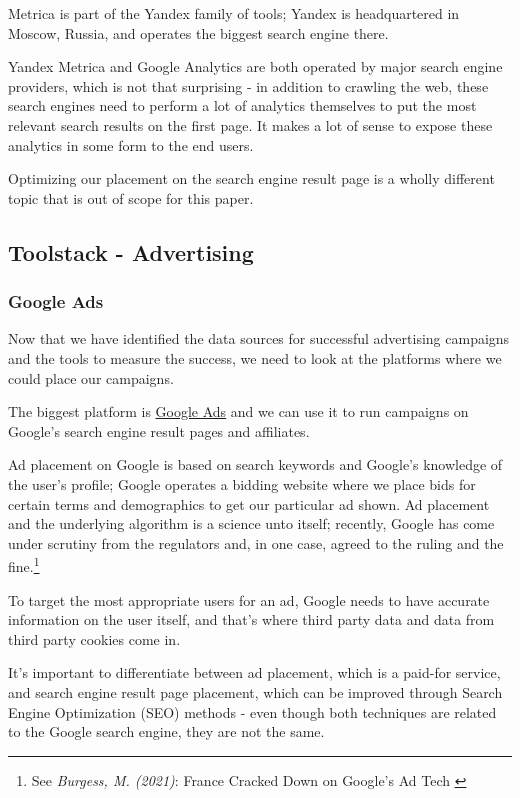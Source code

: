 Metrica is part of the Yandex family of tools; Yandex is headquartered in Moscow, Russia, and operates the biggest search engine there.

Yandex Metrica and Google Analytics are both operated by major search engine providers, which is not that surprising - in addition to crawling the web, these search engines need to perform a lot of analytics themselves to put the most relevant search results on the first page. It makes a lot of sense to expose these analytics in some form to the end users.

Optimizing our placement on the search engine result page is a wholly different topic that is out of scope for this paper.

\subsection{Toolstack - Advertising}

\subsubsection{Google Ads}

Now that we have identified the data sources for successful advertising campaigns and the tools to measure the success, we need to look at the platforms where we could place our campaigns. 

The biggest platform is \href{https://ads.google.com/home/}{Google Ads} and we can use it to run campaigns on Google's search engine result pages and affiliates.

Ad placement on Google is based on search keywords and Google's knowledge of the user's profile; Google operates a bidding website where we place bids for certain terms and demographics to get our particular ad shown. Ad placement and the underlying algorithm is a science unto itself; recently, Google has come under scrutiny from the regulators and, in one case, agreed to the ruling and the fine.\footnote{See \textit{Burgess, M. (2021)}: France Cracked Down on Google’s Ad Tech \cite{googleAds}}

To target the most appropriate users for an ad, Google needs to have accurate information on the user itself, and that's where third party data and data from third party cookies come in.

It's important to differentiate between ad placement, which is a paid-for service, and search engine result page placement, which can be improved through Search Engine Optimization (SEO) methods - even though both techniques are related to the Google search engine, they are not the same.

